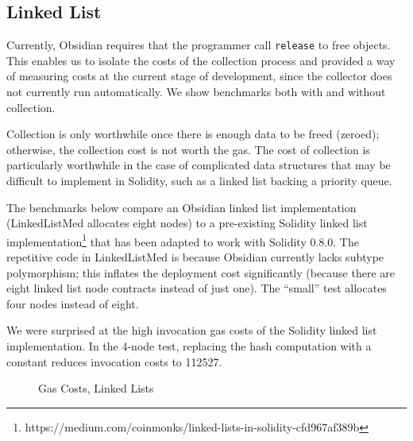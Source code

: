 \subsection{Linked List}

Currently, Obsidian requires that the programmer call \texttt{release} to free objects. This enables us to isolate the costs of the collection process and provided a way of measuring costs at the current stage of development, since the collector does not currently run automatically. We show benchmarks both with and without collection.

Collection is only worthwhile once there is enough data to be freed (zeroed); otherwise, the collection cost is not worth the gas. The cost of collection is particularly worthwhile in the case of complicated data structures that may be difficult to implement in Solidity, such as a linked list backing a priority queue. 

The benchmarks below compare an Obsidian linked list implementation (LinkedListMed allocates eight nodes) to a pre-existing Solidity linked list implementation\footnote{https://medium.com/coinmonks/linked-lists-in-solidity-cfd967af389b} that has been adapted to work with Solidity 0.8.0. The repetitive code in LinkedListMed is because Obsidian currently lacks subtype polymorphism; this inflates the deployment cost significantly (because there are eight linked list node contracts instead of just one). The ``small'' test allocates four nodes instead of eight.

We were surprised at the high invocation gas costs of the Solidity linked list implementation. In the 4-node test, replacing the hash computation with a constant reduces invocation costs to 112527. 


\begin{figure}[hbtp]
    \caption{Gas Costs, Linked Lists}
    \label{data.3}
\end{figure}

%
%
